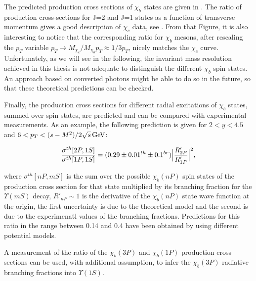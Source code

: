 The predicted production cross sections of $\chi_b$ states are
given in . The ratio of production cross-sections for 
J=2 and J=1 states as a function of transverse
momentum gives a good description of $\chi_c$ data, see . From that Figure, 
it is also interesting to notice that the corresponding ratio for $\chi_b$ mesons, after rescaling the 
$p_T$ variable $p_T \rightarrow M_{\chi_c} / M_{\chi_b} p_T \approx 1/3 p_T$, nicely matches 
the $\chi_c$ curve. Unfortunately, as we will see in the following, the invariant mass resolution achieved 
in this thesis is not adequate to distinguish the different $\chi_b$ spin states. An approach based on 
converted photons might be able to do so in the future, so that these theoretical predictions can be checked. 

Finally, the production cross sections for different radial excitations of $\chi_b$ states, summed over spin states, 
are predicted and can be compared with experimental measurements. As an example, the 
following prediction is given for $2 < y  < 4.5$ and $6 < p_T < (s-M^2)/2\sqrt{s} \mathrm{\,Ge\kern -0.1em V}$:

\begin{equation}
\frac{\sigma^{th}[2P,1S]}{\sigma^{th}[1P,1S]} = (0.29 \pm 0.01^{th} \pm 0.1^{br}) \Bigl| \frac{R'_{2P}}{R'_{1P}}\Bigr|^2, 
\end{equation}

\noindent where $\sigma^{th}[nP,mS]$ is the sum over the possible $\chi_b(nP)$ spin states of the production cross 
section for that state multiplied by its branching fraction for the $\Upsilon(mS)$ decay, $R'_{nP} \sim 1$ is the derivative 
of the $\chi_b(nP)$ state wave function at the origin, the first uncertainty is due to the theoretical model and the second 
is due to the experimenatl values of the branching fractions.  Predictions for this ratio in the range between 0.14 and 0.4 
have been obtained by using different potential models. 

A measurement of the ratio of the $\chi_b(3P)$ and $\chi_b(1P)$ production cross sections can be used, with additional assumption, 
to infer the $\chi_b(3P)$ radiative branching fractions into $\Upsilon(1S)$. 

